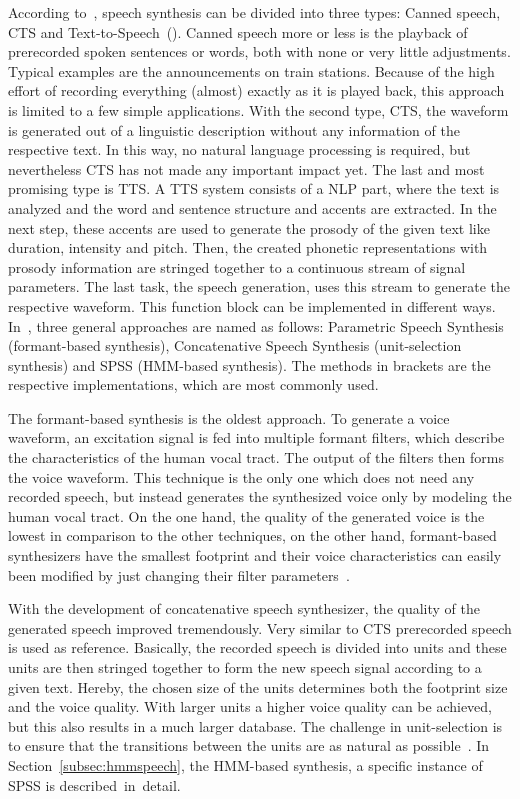 According to~\cite{hinterleitner:quality}, speech synthesis can be divided into three types: Canned speech, \ac{CTS} and Text-to-\break Speech~(). Canned speech more or less is the playback of prerecorded spoken sentences or words, both with none or very little adjustments. Typical examples are the announcements on train stations. Because of the high effort of recording everything (almost) exactly as it is played back, this approach is limited to a few simple applications. With the second type, \ac{CTS}, the waveform is generated out of a linguistic description without any information of the respective text. In this way, no natural language processing is required, but nevertheless \ac{CTS} has not made any important impact yet. The last and most promising type is \ac{TTS}. A \ac{TTS} system consists of a \ac{NLP} part, where the text is analyzed and the word and sentence structure and accents are extracted. In the next step, these accents are used to generate the prosody of the given text like duration, intensity and pitch. Then, the created phonetic representations with prosody information are stringed together to a continuous stream of signal parameters. The last task, the speech generation, uses this stream to generate the respective waveform. This function block can be implemented in different ways. In~\cite{hinterleitner:quality}, three general approaches are named as follows: Parametric Speech Synthesis (formant-based synthesis), Concatenative Speech Synthesis (unit-selection synthesis) and \acf{SPSS} (\acf{HMM}-based synthesis). The methods in brackets are the respective implementations, which are most commonly used. 

The formant-based synthesis is the oldest approach. To generate a voice waveform, an excitation signal is fed into multiple formant filters, which describe the characteristics of the human vocal tract. The output of the filters then forms the voice waveform. This technique is the only one which does not need any recorded speech, but instead generates the synthesized voice only by modeling the human vocal tract. On the one hand, the quality of the generated voice is the lowest in comparison to the other techniques, on the other hand, formant-based synthesizers have the smallest footprint and their voice characteristics can easily been modified by just changing their filter parameters~\cite{hinterleitner:quality}.

With the development of concatenative speech synthesizer, the quality of the generated speech improved tremendously. Very similar to \ac{CTS} prerecorded speech is used as reference. Basically, the recorded speech is divided into units and these units are then stringed together to form the new speech signal according to a given text. Hereby, the chosen size of the units determines both the footprint size and the voice quality. With larger units a higher voice quality can be achieved, but this also results in a much larger database. The challenge in unit-selection is to ensure that the transitions between the units are as natural as possible~\cite{hinterleitner:quality}. In Section~\ref{subsec:hmmspeech}, the \ac{HMM}-based synthesis, a specific instance of \ac{SPSS} is described~in~detail.

